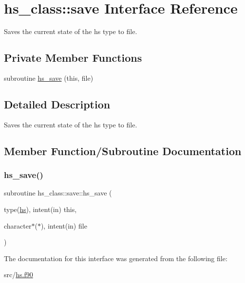 \hypertarget{interfacehs__class_1_1save}{}\section{hs\+\_\+class\+:\+:save Interface Reference}
\label{interfacehs__class_1_1save}


Saves the current state of the hs type to file.  


\subsection*{Private Member Functions}
\begin{DoxyCompactItemize}
\item 
subroutine \hyperlink{interfacehs__class_1_1save_abb8bcc0e9165b7ed3d785b51af09dc73}{hs\+\_\+save} (this, file)
\end{DoxyCompactItemize}


\subsection{Detailed Description}
Saves the current state of the hs type to file. 

\subsection{Member Function/\+Subroutine Documentation}
\mbox{\label{interfacehs__class_1_1save_abb8bcc0e9165b7ed3d785b51af09dc73}} 
\subsubsection{\texorpdfstring{hs\+\_\+save()}{hs\_save()}}
{\footnotesize\ttfamily subroutine hs\+\_\+class\+::save\+::hs\+\_\+save (\begin{DoxyParamCaption}\item[{type(\hyperlink{strucths__class_1_1hs}{hs}), intent(in)}]{this,  }\item[{character$\ast$($\ast$), intent(in)}]{file }\end{DoxyParamCaption})\hspace{0.3cm}{\ttfamily [private]}}



The documentation for this interface was generated from the following file\+:\begin{DoxyCompactItemize}
\item 
src/\hyperlink{hs_8f90}{hs.\+f90}\end{DoxyCompactItemize}
